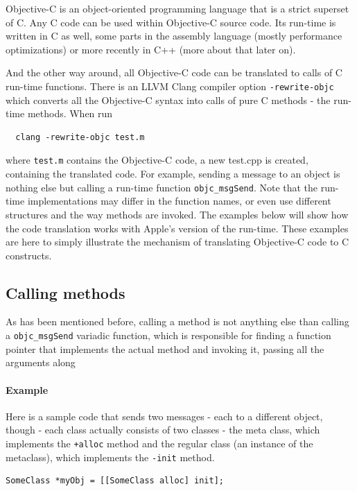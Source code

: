 Objective-C is an object-oriented programming language that is a strict superset of C. Any C code can be used within Objective-C source code. Its run-time is written in C as well, some parts in the assembly language (mostly performance optimizations) or more recently in C++ (more about that later on).

And the other way around, all Objective-C code can be translated to calls of C run-time functions. There is an LLVM Clang compiler option \verb=-rewrite-objc= which converts all the Objective-C syntax into calls of pure C methods - the run-time methods. When run 

\begin{verbatim}
  clang -rewrite-objc test.m
\end{verbatim}

where \verb=test.m= contains the Objective-C code, a new test.cpp is created, containing the translated code. For example, sending a message to an object is nothing else but calling a run-time function \verb=objc_msgSend=. Note that the run-time implementations may differ in the function names, or even use different structures and the way methods are invoked. The examples below will show how the code translation works with Apple's version of the run-time. These examples are here to simply illustrate the mechanism of translating Objective-C code to C constructs.

\subsection{Calling methods}

As has been mentioned before, calling a method is not anything else than calling a \verb=objc_msgSend= variadic function, which is responsible for finding a function pointer that implements the actual method and invoking it, passing all the arguments along

\paragraph{Example}
Here is a sample code that sends two messages - each to a different object, though - each class actually consists of two classes - the meta class, which implements the \verb=+alloc= method and the regular class (an instance of the metaclass), which implements the \verb=-init= method.

\begin{verbatim}SomeClass *myObj = [[SomeClass alloc] init];\end{verbatim}

